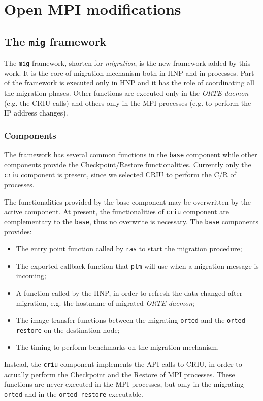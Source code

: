 \section{Open MPI modifications}
\subsection{The \texttt{mig} framework}
The \texttt{mig} framework, shorten for \emph{migration}, is the new framework
added by this work. It is the core of migration mechanism both in HNP and in
processes. Part of the framework is executed only in HNP and it has the role of
coordinating all the migration phases. Other functions are executed only in
the \emph{ORTE daemon} (e.g. the CRIU calls) and others only in the MPI
processes (e.g. to perform the IP address changes).

\subsubsection{Components}
The framework has several common functions in the \texttt{base} component while
other components provide the Checkpoint/Restore functionalities. Currently only
the \texttt{criu} component is present, since we selected CRIU to perform the
C/R of processes.

The functionalities provided by the base component may be overwritten by the
active component. At present, the functionalities of \texttt{criu} component are
complementary to the \texttt{base}, thus no overwrite is necessary. The
\texttt{base} components provides:
\begin{itemize}
\item The entry point function called by \texttt{ras} to start the migration
      procedure;
\item The exported callback function that \texttt{plm} will use when a migration
      message is incoming;  
\item A function called by the HNP, in
      order to refresh the data changed after migration, e.g. the hostname of
      migrated \emph{ORTE daemon};
\item The image transfer functions between the migrating \texttt{orted} and the
      \linebreak
      \texttt{orted-restore} on the destination node; 
\item The timing to perform benchmarks on the migration mechanism.
\end{itemize}

Instead, the \texttt{criu} component implements the API calls to CRIU, 
in order to actually perform the Checkpoint and the Restore of MPI
processes.
These functions are never executed in the MPI processes, but only in the
migrating \texttt{orted} and in the \texttt{orted-restore} executable.

